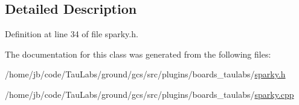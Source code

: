 \subsection{\-Detailed \-Description}


\-Definition at line 34 of file sparky.\-h.



\-The documentation for this class was generated from the following files\-:\begin{DoxyCompactItemize}
\item 
/home/jb/code/\-Tau\-Labs/ground/gcs/src/plugins/boards\-\_\-taulabs/\hyperlink{sparky_8h}{sparky.\-h}\item 
/home/jb/code/\-Tau\-Labs/ground/gcs/src/plugins/boards\-\_\-taulabs/\hyperlink{sparky_8cpp}{sparky.\-cpp}\end{DoxyCompactItemize}
